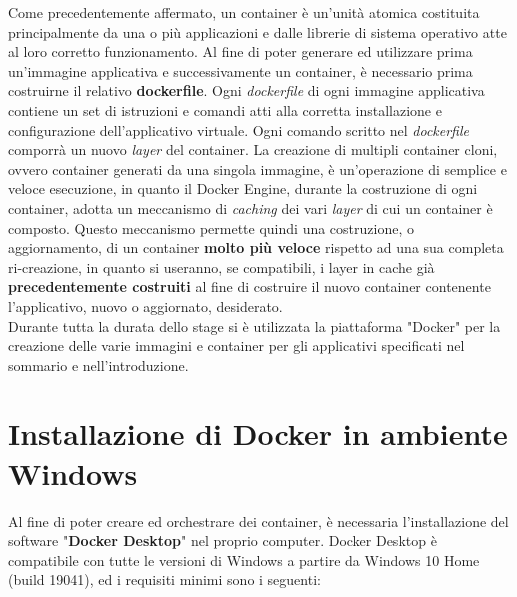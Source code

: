 Come precedentemente affermato, un container è un'unità atomica costituita principalmente da una o più applicazioni e dalle librerie di sistema operativo atte al loro corretto funzionamento.
Al fine di poter generare ed utilizzare prima un'immagine applicativa e successivamente un container, è necessario prima costruirne il relativo \textbf{\gls{dockerfile}}.
Ogni \textit{dockerfile} di ogni immagine applicativa contiene un set di istruzioni e comandi atti alla corretta installazione e configurazione dell'applicativo virtuale. Ogni comando scritto nel \textit{dockerfile} comporrà un nuovo \textit{layer} del container.
La creazione di multipli container cloni, ovvero container generati da una singola immagine, è un'operazione di semplice e veloce esecuzione, in quanto il Docker Engine, durante la costruzione di ogni container, adotta un meccanismo di \textit{\gls{caching}} dei vari \textit{\gls{layer}} di cui un container è composto. Questo meccanismo permette quindi una costruzione, o aggiornamento, di un container \textbf{molto più veloce} rispetto ad una sua completa ri-creazione, in quanto si useranno, se compatibili, i layer in cache già \textbf{precedentemente costruiti} al fine di costruire il nuovo container contenente l'applicativo, nuovo o aggiornato, desiderato.\\
Durante tutta la durata dello stage si è utilizzata la piattaforma "Docker" per la creazione delle varie immagini e container per gli applicativi specificati nel sommario e nell'introduzione.

\section{Installazione di Docker in ambiente Windows}
Al fine di poter creare ed orchestrare dei container, è necessaria l'installazione del software "\textbf{Docker Desktop}" nel proprio computer. Docker Desktop è compatibile con tutte le versioni di Windows a partire da Windows 10 Home (build 19041), ed i requisiti minimi sono i seguenti:

